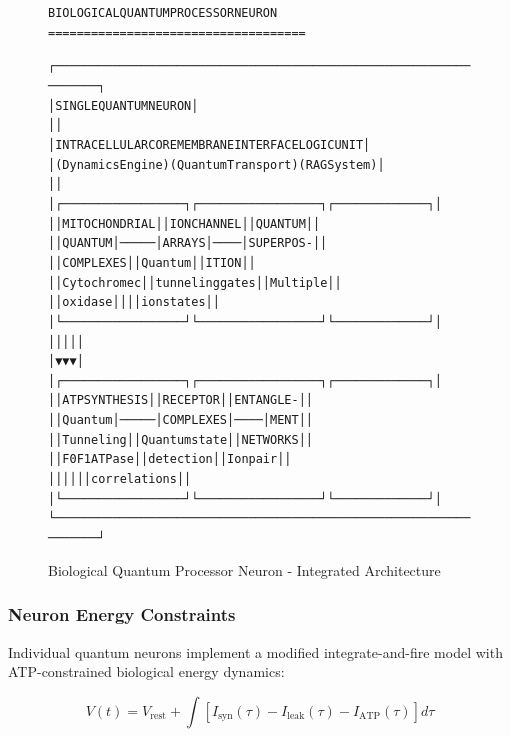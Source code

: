 \documentclass[11pt,a4paper]{article}
\newenvironment{asciiart}{\begin{alltt}}{\end{alltt}}
\begin{document}
\begin{figure}[H]
\centering
\begin{asciiart}
BIOLOGICAL QUANTUM PROCESSOR NEURON
====================================

    ┌─────────────────────────────────────────────────────────────────┐
    │                    SINGLE QUANTUM NEURON                       │
    │                                                                 │
    │  INTRACELLULAR CORE      MEMBRANE INTERFACE     LOGIC UNIT     │
    │  (Dynamics Engine)       (Quantum Transport)    (RAG System)   │
    │                                                                 │
    │  ┌─────────────────┐     ┌─────────────────┐    ┌─────────────┐ │
    │  │ MITOCHONDRIAL   │     │ ION CHANNEL     │    │ QUANTUM     │ │
    │  │ QUANTUM         │─────│ ARRAYS          │────│ SUPERPOS-   │ │
    │  │ COMPLEXES       │     │ Quantum         │    │ ITION       │ │
    │  │ Cytochrome c    │     │ tunneling gates │    │ Multiple    │ │
    │  │ oxidase         │     │                 │    │ ion states  │ │
    │  └─────────────────┘     └─────────────────┘    └─────────────┘ │
    │           │                        │                     │      │
    │           ▼                        ▼                     ▼      │
    │  ┌─────────────────┐     ┌─────────────────┐    ┌─────────────┐ │
    │  │ ATP SYNTHESIS   │     │ RECEPTOR        │    │ ENTANGLE-   │ │
    │  │ Quantum         │─────│ COMPLEXES       │────│ MENT        │ │
    │  │ Tunneling       │     │ Quantum state   │    │ NETWORKS    │ │
    │  │ F0F1 ATPase     │     │ detection       │    │ Ion pair    │ │
    │  │                 │     │                 │    │ correlations│ │
    │  └─────────────────┘     └─────────────────┘    └─────────────┘ │
    └─────────────────────────────────────────────────────────────────┘
\end{asciiart}
\caption{Biological Quantum Processor Neuron - Integrated Architecture}
\end{figure}

\subsubsection{Neuron Energy Constraints}

Individual quantum neurons implement a modified integrate-and-fire model with ATP-constrained biological energy dynamics:

\begin{equation}
V(t) = V_{\text{rest}} + \int [I_{\text{syn}}(\tau) - I_{\text{leak}}(\tau) - I_{\text{ATP}}(\tau)] d\tau
\end{equation}
\end{document}
